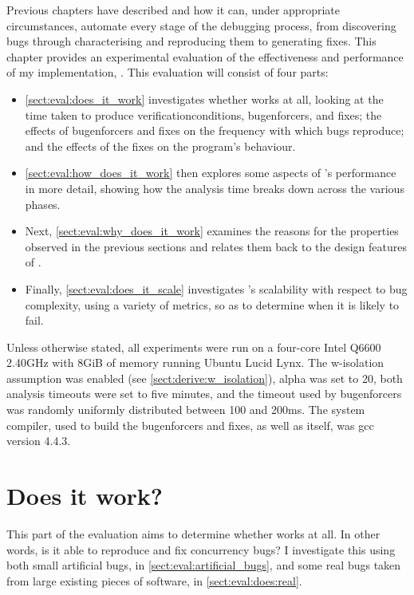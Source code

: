 \noindent
Previous chapters have described {\technique} and how it can, under
appropriate circumstances, automate every stage of the debugging
process, from discovering bugs through characterising and reproducing
them to generating fixes.  This chapter provides an experimental
evaluation of the effectiveness and performance of my implementation,
{\implementation}.  This evaluation will consist of four parts:
\begin{itemize}
\item \autoref{sect:eval:does_it_work} investigates whether
  {\implementation} works at all, looking at the time taken to produce
  \glspl{verificationcondition}, \glspl{bugenforcer}, and fixes; the
  effects of \glspl{bugenforcer} and fixes on the frequency with which
  bugs reproduce; and the effects of the fixes on the program's
  behaviour.
\item \autoref{sect:eval:how_does_it_work} then explores some aspects
  of {\implementation}'s performance in more detail, showing how the
  analysis time breaks down across the various phases.
\item Next, \autoref{sect:eval:why_does_it_work} examines the reasons
  for the properties observed in the previous sections and relates
  them back to the design features of {\technique}.
\item Finally, \autoref{sect:eval:does_it_scale} investigates
  {\implementation}'s scalability with respect to bug complexity, using a
  variety of metrics, so as to determine when it is likely to fail.
\end{itemize}
Unless otherwise stated, all experiments were run on a four-core Intel
Q6600 2.40GHz with 8GiB of memory running Ubuntu Lucid Lynx.  The
\gls{w-isolation} assumption was enabled (see
\autoref{sect:derive:w_isolation}), \gls{alpha} was set to 20, both
analysis timeouts were set to five minutes, and the timeout used by
\glspl{bugenforcer} was randomly uniformly distributed between 100 and
200ms.  The system compiler, used to build the \glspl{bugenforcer} and
fixes, as well as {\implementation} itself, was gcc version 4.4.3.

\section{Does it work?}
\label{sect:eval:does_it_work}

This part of the evaluation aims to determine whether {\implementation}
works at all.  In other words, is it able to reproduce and fix
concurrency bugs?  I investigate this using both small artificial
bugs, in \autoref{sect:eval:artificial_bugs}, and some real bugs taken
from large existing pieces of software, in
\autoref{sect:eval:does:real}.

